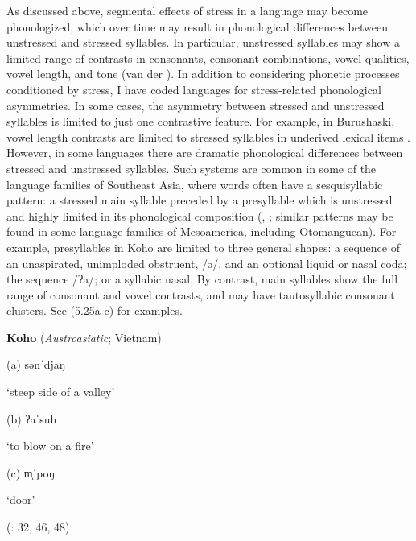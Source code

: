   As discussed above, segmental effects of stress in a language may become phonologized, which over time may result in phonological differences between unstressed and stressed syllables. In particular, unstressed syllables may show a limited range of contrasts in consonants, consonant combinations, vowel qualities, vowel length, and tone (van der \citealt{Hulst2010}). In addition to considering phonetic processes conditioned by stress, I have coded languages for stress-related phonological asymmetries. In some cases, the asymmetry between stressed and unstressed syllables is limited to just one contrastive feature. For example, in Burushaski, vowel length contrasts are limited to stressed syllables in underived lexical items \citep[1028]{Anderson1997}. However, in some languages there are dramatic phonological differences between stressed and unstressed syllables. Such systems are common in some of the language families of Southeast Asia, where words often have a sesquisyllabic pattern: a stressed main syllable preceded by a presyllable which is unstressed and highly limited in its phonological composition (\citealt{Matisoff1973}, \citealt{Michaud2012}; similar patterns may be found in some language families of Mesoamerica, including Otomanguean). For example, presyllables in Koho are limited to three general shapes: a sequence of an unaspirated, unimploded obstruent, /ə/, and an optional liquid or nasal coda; the sequence /ʔa/; or a syllabic nasal. By contrast, main syllables show the full range of consonant and vowel contrasts, and may have tautosyllabic consonant clusters. See (5.25a-c) for examples.



\ea\label{ex:(5.25)}
  \textbf{Koho} (\textit{Austroasiatic}; Vietnam)



(a)  sənˈdjaŋ



‘steep side of a valley’



(b)  ʔaˈsuh



‘to blow on a fire’



(c)  m̩ˈpoŋ



‘door’



(\citealt{Olsen2014}: 32, 46, 48)

\z


